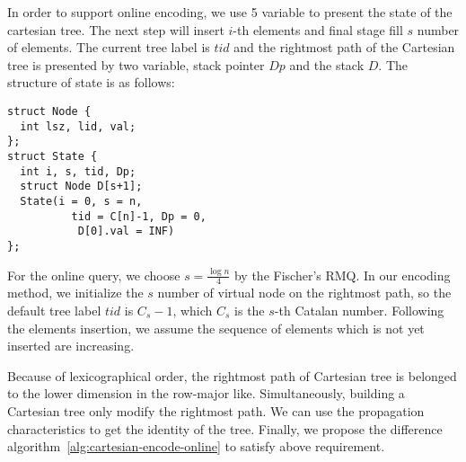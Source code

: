 \iffalse
根據先前的字典順序編碼，只需要維護笛卡爾樹的右鏈，實作上與堆疊結構相同。
基於 row-major 順序和遞迴定義 ~\ref{fun:LCA}，修改之前論文對於的離線編碼，
其對應方案如算法 \ref{alg:cartesian-encode-offline}。
\fi



In order to support online encoding, we use 5 variable to present the
state of the cartesian tree.  The next step will insert $i$-th
elements and final stage fill $s$ number of elements.  The current
tree label is $\mathit{tid}$ and the rightmost path of the Cartesian
tree is presented by two variable, stack pointer $\mathit{Dp}$ and the
stack $\mathit{D}$. The structure of state is as follows:

\iffalse
我們定義轉移狀態由 5 個變數來決定動態笛卡爾樹的編碼，當前插入第 $i$ 個元素，最終填充 $s$ 個元素，
當前的樹編號 $\mathit{tid}$，以及笛卡爾樹的右鏈狀態指針 $Dp$ 與其堆疊 $D$，其結構如下：
\fi

\begin{minipage}{0.9\linewidth}
\begin{lstlisting}[frame=single,caption=State of Cartesian Tree]
struct Node {
  int lsz, lid, val;
};
struct State {
  int i, s, tid, Dp;
  struct Node D[s+1];
  State(i = 0, s = n, 
          tid = C[n]-1, Dp = 0,
           D[0].val = INF)
};
\end{lstlisting}
\end{minipage}

For the online query, we choose $s=\frac{\log n}{4}$ by the Fischer's
RMQ.  In our encoding method, we initialize the $s$ number of virtual
node on the rightmost path, so the default tree label $\mathit{tid}$
is $C_s - 1$, which $C_s$ is the $s$-th Catalan number.  Following the
elements insertion, we assume the sequence of elements which is not
yet inserted are increasing.

Because of lexicographical order, the rightmost path of Cartesian tree
is belonged to the lower dimension in the row-major like.
Simultaneously, building a Cartesian tree only modify the rightmost
path. We can use the propagation characteristics to get the identity of
the tree.  Finally, we propose the difference 
algorithm~\ref{alg:cartesian-encode-online} to satisfy above requirement.

\iffalse
為了解決在線詢問操作，取 $s = \frac{\log n}{4}$。
根據字典順序的編碼性質，一開始建立虛設點 $s$ 個在右鏈上，其樹編號 $\mathit{tid} = C_s - 1$ 。
隨著插入元素的增加，尚未加入的元素都預設嚴格遞減，加上根據編碼順序，我們藉由差值來維護在線編碼 (如圖 ~\ref{fig:cartesianEncoding})。
根據上述的編碼想法，我們得到算法 ~\ref{alg:cartesian-encode-online}。
\fi

